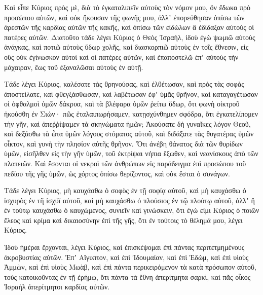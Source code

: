 {Καὶ εἶπε Κύριος πρὸς μὲ, διὰ τὸ ἐγκαταλιπεῖν αὐτοὺς τὸν νόμον μου, ὃν ἔδωκα πρὸ προσώπου αὐτῶν, καὶ οὐκ ἤκουσαν τῆς φωνῆς μου,
ἀλλʼ ἐπορεύθησαν ὀπίσω τῶν ἀρεστῶν τῆς καρδίας αὐτῶν τῆς κακῆς, καὶ ὀπίσω τῶν εἰδώλων ἃ ἐδίδαξαν αὐτοὺς οἱ πατέρες αὐτῶν.
Διατοῦτο τάδε λέγει Κύριος ὁ Θεὸς Ἰσραὴλ, ἰδοὺ ἐγὼ ψωμιῶ αὐτοὺς ἀνάγκας, καὶ ποτιῶ αὐτοὺς ὕδωρ χολῆς,
καὶ διασκορπιῶ αὐτοὺς ἐν τοῖς ἔθνεσιν, εἰς οὓς οὐκ ἐγίνωσκον αὐτοὶ καὶ οἱ πατέρες αὐτῶν, καὶ ἐπαποστελῶ ἐπʼ αὐτοὺς τὴν μάχαιραν, ἕως τοῦ ἐξαναλῶσαι αὐτοὺς ἐν αὐτῇ.
\par }{\PP {}Τάδε λέγει Κύριος, καλέσατε τὰς θρηνούσας, καὶ ἐλθέτωσαν, καὶ πρὸς τὰς σοφὰς ἀποστείλατε, καὶ φθεγξάσθωσαν,
καὶ λαβέτωσαν ἐφʼ ὑμᾶς θρῆνον, καὶ καταγαγέτωσαν οἱ ὀφθαλμοὶ ὑμῶν δάκρυα, καὶ τὰ βλέφαρα ὑμῶν ῥείτω ὕδωρ,
ὅτι φωνὴ οἰκτροῦ ἠκούσθη ἐν Σιών· πῶς ἐταλαιπωρήσαμεν, κατῃσχύνθημεν σφόδρα, ὅτι ἐγκατελίπομεν τὴν γῆν, καὶ ἀπεῤῥίψαμεν τὰ σκηνώματα ἡμῶν;
Ἀκούσατε δὴ γυναῖκες λόγον Θεοῦ, καὶ δεξάσθω τὰ ὦτα ὑμῶν λόγους στόματος αὐτοῦ, καὶ διδάξατε τὰς θυγατέρας ὑμῶν οἶκτον, καὶ γυνὴ τὴν πλησίον αὐτῆς θρῆνον.
Ὅτι ἀνέβη θάνατος διὰ τῶν θυρίδων ὑμῶν, εἰσῆλθεν εἰς τὴν γῆν ὑμῶν, τοῦ ἐκτρίψαι νήπια ἔξωθεν, καὶ νεανίσκους ἀπὸ τῶν πλατειῶν.
Καὶ ἔσονται οἱ νεκροὶ τῶν ἀνθρώπων εἰς παράδειγμα ἐπὶ προσώπου τοῦ πεδίου τῆς γῆς ὑμῶν, ὡς χόρτος ὀπίσω θερίζοντος, καὶ οὐκ ἔσται ὁ συνάγων.
\par }{\PP {}Τάδε λέγει Κύριος, μὴ καυχάσθω ὁ σοφὸς ἐν τῇ σοφίᾳ αὐτοῦ, καὶ μὴ καυχάσθω ὁ ἰσχυρὸς ἐν τῆ ἰσχύϊ αὐτοῦ, καὶ μὴ καυχάσθω ὁ πλούσιος ἐν τῷ πλούτῳ αὐτοῦ,
ἀλλʼ ἢ ἐν τούτῳ καυχάσθω ὁ καυχώμενος, συνιεῖν καὶ γινώσκειν, ὅτι ἐγώ εἰμι Κύριος ὁ ποιῶν ἔλεος καὶ κρίμα καὶ δικαιοσύνην ἐπὶ τῆς γῆς, ὅτι ἐν τούτοις τὸ θέλημά μου, λέγει Κύριος.
\par }{\PP {}Ἰδοὺ ἡμέραι ἔρχονται, λέγει Κύριος, καὶ ἐπισκέψομαι ἐπὶ πάντας περιτετμημένους ἀκροβυστίας αὐτῶν.
Ἐπʼ Αἴγυπτον, καὶ ἐπὶ Ἰδουμαίαν, καὶ ἐπὶ Ἐδὼμ, καὶ ἐπὶ υἱοὺς Ἀμμὼν, καὶ ἐπὶ υἱοὺς Μωὰβ, καὶ ἐπὶ πάντα περικειρόμενον τὰ κατὰ πρόσωπον αὐτοῦ, τοὺς κατοικοῦντας ἐν τῇ ἐρήμῳ, ὅτι πάντα τὰ ἔθνη ἀπερίτμητα σαρκὶ, καὶ πᾶς οἶκος Ἰσραὴλ ἀπερίτμητοι καρδίας αὐτῶν.

}
